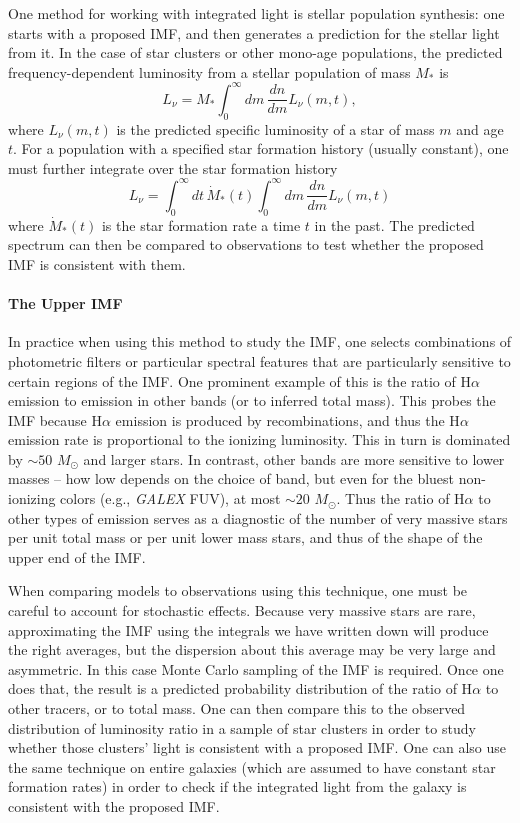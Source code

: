 One method for working with integrated light is stellar population synthesis: one starts with a proposed IMF, and then generates a prediction for the stellar light from it. In the case of star clusters or other mono-age populations, the predicted frequency-dependent luminosity from a stellar population of mass $M_*$ is
\begin{equation}
L_\nu = M_* \int_0^\infty dm \,\frac{dn}{dm} L_\nu(m,t),
\end{equation}
where $L_\nu(m,t)$ is the predicted specific luminosity of a star of mass $m$ and age $t$. For a population with a specified star formation history (usually constant), one must further integrate over the star formation history
\begin{equation}
L_\nu = \int_0^{\infty} dt\, \dot{M}_*(t) \int_0^\infty dm\, \frac{dn}{dm} L_\nu(m,t)
\end{equation}
where $\dot{M}_*(t)$ is the star formation rate a time $t$ in the past. The predicted spectrum can then be compared to observations to test whether the proposed IMF is consistent with them.

\paragraph{The Upper IMF} In practice when using this method to study the IMF, one selects combinations of photometric filters or particular spectral features that are particularly sensitive to certain regions of the IMF. One prominent example of this is the ratio of H$\alpha$ emission to emission in other bands (or to inferred total mass). This probes the IMF because H$\alpha$ emission is produced by recombinations, and thus the H$\alpha$ emission rate is proportional to the ionizing luminosity. This in turn is dominated by $\sim 50$ $M_\odot$ and larger stars. In contrast, other bands are more sensitive to lower masses -- how low depends on the choice of band, but even for the bluest non-ionizing colors (e.g., \textit{GALEX} FUV), at most $\sim 20$ $M_\odot$. Thus the ratio of H$\alpha$ to other types of emission serves as a diagnostic of the number of very massive stars per unit total mass or per unit lower mass stars, and thus of the shape of the upper end of the IMF.

When comparing models to observations using this technique, one must be careful to account for stochastic effects. Because very massive stars are rare, approximating the IMF using the integrals we have written down will produce the right averages, but the dispersion about this average may be very large and asymmetric. In this case Monte Carlo sampling of the IMF is required. Once one does that, the result is a predicted probability distribution of the ratio of H$\alpha$ to other tracers, or to total mass. One can then compare this to the observed distribution of luminosity ratio in a sample of star clusters in order to study whether those clusters' light is consistent with a proposed IMF. One can also use the same technique on entire galaxies (which are assumed to have constant star formation rates) in order to check if the integrated light from the galaxy is consistent with the proposed IMF.

